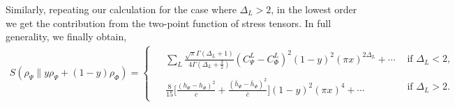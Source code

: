 \documentclass[11pt]{article}
\newcommand{\tr}{\mathrm{tr}}
\newcommand{\lb}{\left(}
\newcommand{\rb}{\right)}
\begin{document}
Similarly, repeating our calculation for the case where $\Delta_L>2$, in the lowest order we get the contribution from the two-point function of stress tensors. In full generality, we finally obtain, 
\begin{align}\label{smallxMixture}
\boxed{
S(\rho_\Psi\|y\rho_\Psi+(1-y)\rho_\Phi)
=
\begin{cases}
\begin{aligned}
&\sum_L\frac{\sqrt{\pi}\Gamma(\Delta_L+1)}
{4\Gamma(\Delta_L+\frac32)}
(C^L_{\Psi}-C^L_{\Phi})^2
(1-y)^2(\pi x)^{2\Delta_L}
+\cdots
\end{aligned}
&
\text{if }\Delta_L< 2,
\\[2ex]
\begin{aligned}
&\frac{8}{15}
\Bigg[
\frac{(h_\Psi-h_\Phi)^2}{c} 
+\frac{(\bar h_\Psi-\bar h_\Phi)^2}{\bar c}
\Bigg]
(1-y)^2(\pi x)^4
+\cdots
\end{aligned}
&
\text{if }\Delta_L>2 .
\end{cases}
}
\end{align}
\end{document}
